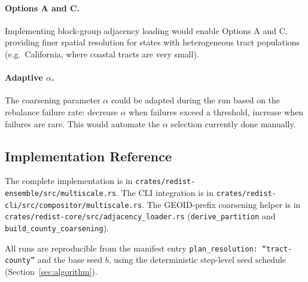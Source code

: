 \paragraph{Options A and C.}
Implementing block-group adjacency loading would enable Options A and C,
providing finer spatial resolution for states with heterogeneous tract
populations (e.g.\ California, where coastal tracts are very small).

\paragraph{Adaptive $\alpha$.}
The coarsening parameter $\alpha$ could be adapted during the run based on
the rebalance failure rate: decrease $\alpha$ when failures exceed a threshold,
increase when failures are rare.
This would automate the $\alpha$ selection currently done manually.

\subsection{Implementation Reference}

The complete implementation is in \texttt{crates/redist-ensemble/src/multiscale.rs}.
The CLI integration is in \texttt{crates/redist-cli/src/compositor/multiscale.rs}.
The GEOID-prefix coarsening helper is in
\texttt{crates/redist-core/src/adjacency\_loader.rs}
(\texttt{derive\_partition} and \texttt{build\_county\_coarsening}).

All runs are reproducible from the manifest entry \texttt{plan\_resolution: ``tract-county''}
and the base seed $b$, using the deterministic step-level seed schedule
(Section~\ref{sec:algorithm}).
